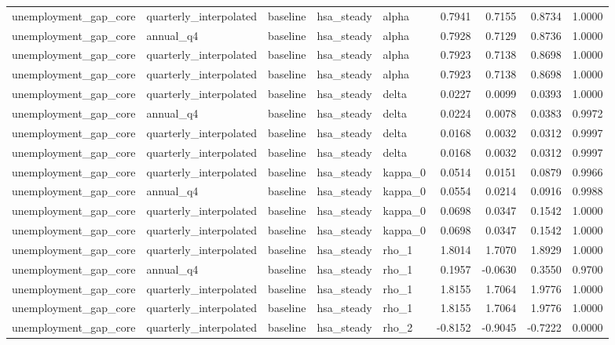 \begin{tabular}{lllllrrrr}
unemployment\_gap\_core & quarterly\_interpolated & baseline & hsa\_steady & alpha & 0.7941 & 0.7155 & 0.8734 & 1.0000 \\
unemployment\_gap\_core & annual\_q4 & baseline & hsa\_steady & alpha & 0.7928 & 0.7129 & 0.8736 & 1.0000 \\
unemployment\_gap\_core & quarterly\_interpolated & baseline & hsa\_steady & alpha & 0.7923 & 0.7138 & 0.8698 & 1.0000 \\
unemployment\_gap\_core & quarterly\_interpolated & baseline & hsa\_steady & alpha & 0.7923 & 0.7138 & 0.8698 & 1.0000 \\
unemployment\_gap\_core & quarterly\_interpolated & baseline & hsa\_steady & delta & 0.0227 & 0.0099 & 0.0393 & 1.0000 \\
unemployment\_gap\_core & annual\_q4 & baseline & hsa\_steady & delta & 0.0224 & 0.0078 & 0.0383 & 0.9972 \\
unemployment\_gap\_core & quarterly\_interpolated & baseline & hsa\_steady & delta & 0.0168 & 0.0032 & 0.0312 & 0.9997 \\
unemployment\_gap\_core & quarterly\_interpolated & baseline & hsa\_steady & delta & 0.0168 & 0.0032 & 0.0312 & 0.9997 \\
unemployment\_gap\_core & quarterly\_interpolated & baseline & hsa\_steady & kappa\_0 & 0.0514 & 0.0151 & 0.0879 & 0.9966 \\
unemployment\_gap\_core & annual\_q4 & baseline & hsa\_steady & kappa\_0 & 0.0554 & 0.0214 & 0.0916 & 0.9988 \\
unemployment\_gap\_core & quarterly\_interpolated & baseline & hsa\_steady & kappa\_0 & 0.0698 & 0.0347 & 0.1542 & 1.0000 \\
unemployment\_gap\_core & quarterly\_interpolated & baseline & hsa\_steady & kappa\_0 & 0.0698 & 0.0347 & 0.1542 & 1.0000 \\
unemployment\_gap\_core & quarterly\_interpolated & baseline & hsa\_steady & rho\_1 & 1.8014 & 1.7070 & 1.8929 & 1.0000 \\
unemployment\_gap\_core & annual\_q4 & baseline & hsa\_steady & rho\_1 & 0.1957 & -0.0630 & 0.3550 & 0.9700 \\
unemployment\_gap\_core & quarterly\_interpolated & baseline & hsa\_steady & rho\_1 & 1.8155 & 1.7064 & 1.9776 & 1.0000 \\
unemployment\_gap\_core & quarterly\_interpolated & baseline & hsa\_steady & rho\_1 & 1.8155 & 1.7064 & 1.9776 & 1.0000 \\
unemployment\_gap\_core & quarterly\_interpolated & baseline & hsa\_steady & rho\_2 & -0.8152 & -0.9045 & -0.7222 & 0.0000 \\

\end{tabular}
